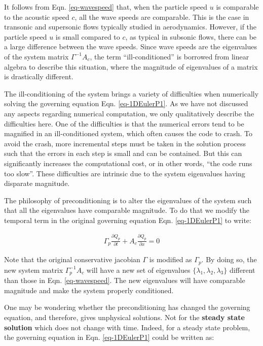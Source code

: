 \documentclass[12pt, letterpaper]{report}
\begin{document}
It follows from Eqn. \ref{eq-wavespeed} that, when the particle speed $u$ is comparable to the
acoustic speed $c$, all the wave speeds are comparable. This is the case in transonic and supersonic
flows typically studied in aerodynamics. However, if the particle speed $u$ is small compared to
$c$, as typical in subsonic flows, there can be a large difference between the wave speeds. Since
wave speeds are the eigenvalues of the system matrix $\Gamma^{-1}A_c$, the term ``ill-conditioned''
is borrowed from linear algebra to describe this situation, where the magnitude of eigenvalues of
a matrix is drastically different. \paraspace

The ill-conditioning of the system brings a variety of difficulties when numerically solving the
governing equation Eqn. \ref{eq-1DEulerP1}. As we have not discussed any aspects regarding
numerical computation, we only qualitatively describe the difficulties here. One of the difficulties
is that the numerical errors tend to be magnified in an ill-conditioned system, which often
causes the code to crash. To avoid the crash, more incremental steps must be taken in the solution
process such that the errors in each step is small and can be contained. But this can significantly
increases the computational cost, or in other words, ``the code runs too slow''. These difficulties
are intrinsic due to the system eigenvalues having disparate magnitude. \paraspace

The philosophy of preconditioning is to alter the eigenvalues of the system such that all the
eigenvalues have comparable magnitude. To do that we modify the temporal term in the original
governing equation Eqn. \ref{eq-1DEulerP1} to write:

\begin{align*}
   \Gamma_p \frac{\partial Q_p}{\partial t} + A_c \frac{\partial Q_p}{\partial x} = 0
\end{align*}

Note that the original conservative jacobian $\Gamma$ is modified as $\Gamma_p$. By doing so, the
new system matrix $\Gamma_p^{-1}A_c$ will have a new set of eigenvalues $\{\lambda_1, \lambda_2,
\lambda_3\}$ different than those in Eqn. \ref{eq-wavespeed}. The new eigenvalues will have
comparable magnitude and make the system properly conditioned. \paraspace

One may be wondering whether the preconditioning has changed the governing equation, and therefore,
gives unphysical solutions. Not for the {\bf steady state solution} which does not change with time.
Indeed, for a steady state problem, the governing equation in Eqn. \ref{eq-1DEulerP1} could be
written as:
\end{document}
